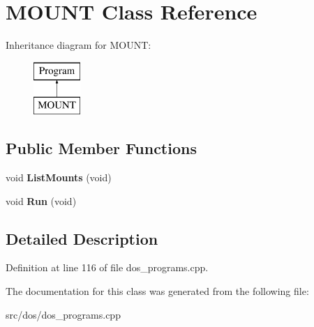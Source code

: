\hypertarget{classMOUNT}{\section{M\-O\-U\-N\-T Class Reference}
\label{classMOUNT}
}
Inheritance diagram for M\-O\-U\-N\-T\-:\begin{figure}[H]
\begin{center}
\leavevmode
\includegraphics[height=2.000000cm]{classMOUNT}
\end{center}
\end{figure}
\subsection*{Public Member Functions}
\begin{DoxyCompactItemize}
\item 
\hypertarget{classMOUNT_a162c6c15860f047f90e4a632cd80f769}{void {\bfseries List\-Mounts} (void)}\label{classMOUNT_a162c6c15860f047f90e4a632cd80f769}

\item 
\hypertarget{classMOUNT_aecbba89c92ac2fbd78a929ed04818d58}{void {\bfseries Run} (void)}\label{classMOUNT_aecbba89c92ac2fbd78a929ed04818d58}

\end{DoxyCompactItemize}


\subsection{Detailed Description}


Definition at line 116 of file dos\-\_\-programs.\-cpp.



The documentation for this class was generated from the following file\-:\begin{DoxyCompactItemize}
\item 
src/dos/dos\-\_\-programs.\-cpp\end{DoxyCompactItemize}

